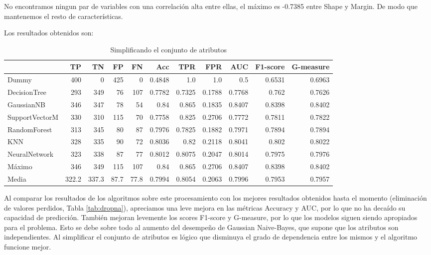 \documentclass{article}
\begin{document}
No encontramos ningun par de variables con una correlación alta entre
ellas, el máximo es -0.7385 entre Shape y Margin. De modo que
mantenemos el resto de características.

Los resultados obtenidos son:

\begin{table}[H]
\centering
\caption{Simplificando el conjunto de atributos}
\label{tab:features}
\begin{tabular}{|lrrrrrrrrrr|}
\hline
 & TP & TN & FP & FN & Acc & TPR & FPR & AUC & F1-score & G-measure\\ \hline
Dummy & 400 & 0 & 425 & 0 & 0.4848 & 1.0 & 1.0 & 0.5 & 0.6531 & 0.6963\\
DecisionTree & 293 & 349 & 76 & 107 & 0.7782 & 0.7325 & 0.1788 & 0.7768 & 0.762 & 0.7626\\
GaussianNB & 346 & 347 & 78 & 54 & 0.84 & 0.865 & 0.1835 & 0.8407 & 0.8398 & 0.8402\\
SupportVectorM & 330 & 310 & 115 & 70 & 0.7758 & 0.825 & 0.2706 & 0.7772 & 0.7811 & 0.7822\\
RandomForest & 313 & 345 & 80 & 87 & 0.7976 & 0.7825 & 0.1882 & 0.7971 & 0.7894 & 0.7894\\
KNN & 328 & 335 & 90 & 72 & 0.8036 & 0.82 & 0.2118 & 0.8041 & 0.802 & 0.8022\\
NeuralNetwork & 323 & 338 & 87 & 77 & 0.8012 & 0.8075 & 0.2047 & 0.8014 & 0.7975 & 0.7976\\ \hline
Máximo & 346 & 349 & 115 & 107 & 0.84 & 0.865 & 0.2706 & 0.8407 & 0.8398 & 0.8402\\
Media & 322.2 & 337.3 & 87.7 & 77.8 & 0.7994 & 0.8054 & 0.2063 & 0.7996 & 0.7953 & 0.7957\\
\hline
\end{tabular}
\end{table}

Al comparar los resultados de los algoritmos sobre este procesamiento
con los mejores resultados obtenidos hasta el momento (eliminación de
valores perdidos, Tabla \ref{tab:dropna}), apreciamos una leve mejora
en las métricas Accuracy y AUC, por lo que no ha decaído su capacidad
de predicción. También mejoran levemente los scores F1-score y
G-measure, por lo que los modelos siguen siendo apropiados para el
problema. Esto se debe sobre todo al aumento del desempeño de Gaussian
Naive-Bayes, que supone que los atributos son independientes. Al
simplificar el conjunto de atributos es lógico que disminuya el grado
de dependencia entre los mismos y el algoritmo funcione mejor.
\end{document}
